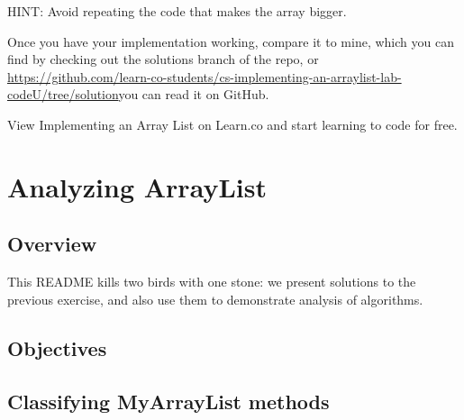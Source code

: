 \documentclass[12pt]{book}
\theoremstyle{exercise}
\newcommand{\java}{\verb}%}
\begin{document}
{HINT: Avoid repeating the code that makes the array bigger.


Once you have your implementation working, compare it to mine, which you
can find by checking out the solutions branch of the repo, or
\url{https://github.com/learn-co-students/cs-implementing-an-arraylist-lab-codeU/tree/solution}{you
can read it on GitHub}.

View Implementing an Array List on Learn.co and start learning to code
for free.

\chapter{Analyzing ArrayList}
\label{cs-analyzing-our-arraylist-readme}

\section{Overview}\label{overview-2}

This README kills two birds with one stone: we present solutions to the
previous exercise, and also use them to demonstrate analysis of algorithms.

\section{Objectives}\label{objectives-4}


\section{Classifying MyArrayList
methods}\label{classifying-myarraylist-methods}

}
\end{document}
